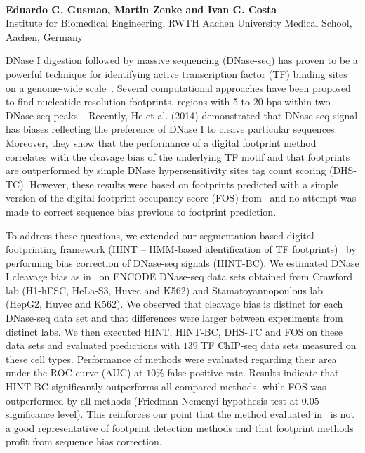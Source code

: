 \documentclass[12pt]{article}
\begin{document}
\pagestyle{empty}
\\
{\bf Eduardo G. Gusmao, Martin Zenke and Ivan G. Costa}\\
Institute for Biomedical Engineering, RWTH Aachen University Medical School, Aachen, Germany\\

\vspace{0.5cm}

DNase I digestion followed by massive sequencing (DNase-seq) has proven to be a powerful technique for identifying active transcription factor (TF) binding sites on a genome-wide scale~\cite{crawford2006b,gusmao2014,he2014,neph2012a}. Several computational approaches have been proposed to find nucleotide-resolution footprints, regions with 5 to 20 bps within two DNase-seq peaks~\cite{gusmao2014,neph2012a}. Recently, He et al. (2014) demonstrated that DNase-seq signal has biases reflecting the preference of DNase I to cleave particular sequences. Moreover, they show that the performance of a digital footprint method correlates with the cleavage bias of the underlying TF motif and that footprints are outperformed by simple DNase hypersensitivity sites tag count scoring (DHS-TC). However, these results were based on footprints predicted with a simple version of the digital footprint occupancy score (FOS) from~\citep{neph2012a} and no attempt was made to correct sequence bias previous to footprint prediction.

To address these questions, we extended our segmentation-based digital footprinting framework (HINT -- HMM-based identification of TF footprints)~\cite{gusmao2014} by performing bias correction of DNase-seq signals (HINT-BC). We estimated DNase I cleavage bias as in~\cite{he2014} on ENCODE DNase-seq data sets obtained from Crawford lab (H1-hESC, HeLa-S3, Huvec and K562) and Stamatoyannopoulous lab (HepG2, Huvec and K562). We observed that cleavage bias is distinct for each DNase-seq data set and that differences were larger between experiments from distinct labs. We then executed HINT, HINT-BC, DHS-TC and FOS on these data sets and evaluated predictions with $139$ TF ChIP-seq data sets measured on these cell types. Performance of methods were evaluated regarding their area under the ROC curve (AUC) at $10$\% false positive rate. Results indicate that HINT-BC significantly outperforms all compared methods, while FOS was outperformed by all methods (Friedman-Nemenyi hypothesis test at $0.05$ significance level). This reinforces our point that the method evaluated in~\cite{he2014} is not a good representative of footprint detection methods and that footprint methods profit from sequence bias correction.
\end{document}
